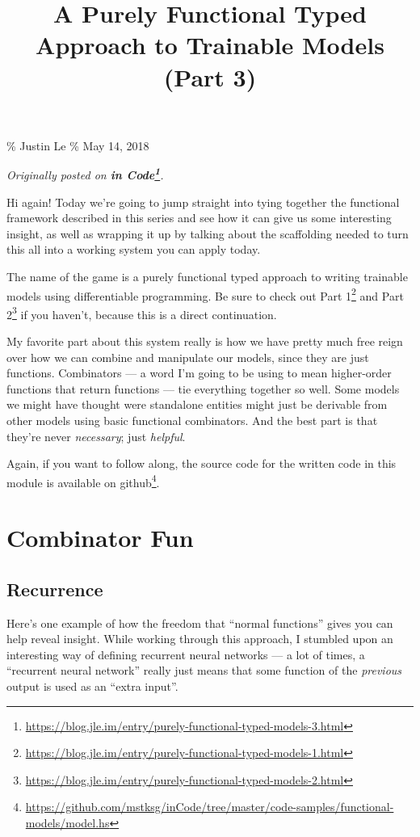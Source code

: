 \documentclass[]{article}
\title{A Purely Functional Typed Approach to Trainable Models (Part 3)}
\renewcommand{\href}[2]{#2\footnote{\url{#1}}}
\begin{document}
\maketitle

\% Justin Le \% May 14, 2018

\emph{Originally posted on
\textbf{\href{https://blog.jle.im/entry/purely-functional-typed-models-3.html}{in
Code}}.}

Hi again! Today we're going to jump straight into tying together the functional
framework described in this series and see how it can give us some interesting
insight, as well as wrapping it up by talking about the scaffolding needed to
turn this all into a working system you can apply today.

The name of the game is a purely functional typed approach to writing trainable
models using differentiable programming. Be sure to check out
\href{https://blog.jle.im/entry/purely-functional-typed-models-1.html}{Part 1}
and \href{https://blog.jle.im/entry/purely-functional-typed-models-2.html}{Part
2} if you haven't, because this is a direct continuation.

My favorite part about this system really is how we have pretty much free reign
over how we can combine and manipulate our models, since they are just
functions. Combinators --- a word I'm going to be using to mean higher-order
functions that return functions --- tie everything together so well. Some models
we might have thought were standalone entities might just be derivable from
other models using basic functional combinators. And the best part is that
they're never \emph{necessary}; just \emph{helpful}.

Again, if you want to follow along, the source code for the written code in this
module is available
\href{https://github.com/mstksg/inCode/tree/master/code-samples/functional-models/model.hs}{on
github}.

\section{Combinator Fun}\label{combinator-fun}

\subsection{Recurrence}\label{recurrence}

Here's one example of how the freedom that ``normal functions'' gives you can
help reveal insight. While working through this approach, I stumbled upon an
interesting way of defining recurrent neural networks --- a lot of times, a
``recurrent neural network'' really just means that some function of the
\emph{previous} output is used as an ``extra input''.
\end{document}
